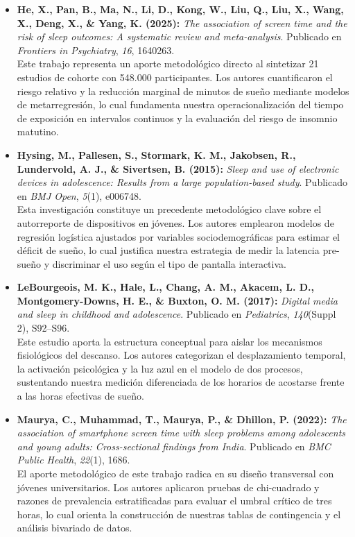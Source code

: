 \documentclass[12pt, letterpaper]{article}
\begin{document}
\begin{itemize}
    \item \textbf{He, X., Pan, B., Ma, N., Li, D., Kong, W., Liu, Q., Liu, X., Wang, X., Deng, X., \& Yang, K. (2025):} \textit{The association of screen time and the risk of sleep outcomes: A systematic review and meta-analysis}. Publicado en \textit{Frontiers in Psychiatry}, \textit{16}, 1640263.\\
    Este trabajo representa un aporte metodológico directo al sintetizar 21 estudios de cohorte con 548.000 participantes. Los autores cuantificaron el riesgo relativo y la reducción marginal de minutos de sueño mediante modelos de metarregresión, lo cual fundamenta nuestra operacionalización del tiempo de exposición en intervalos continuos y la evaluación del riesgo de insomnio matutino.

    \item \textbf{Hysing, M., Pallesen, S., Stormark, K. M., Jakobsen, R., Lundervold, A. J., \& Sivertsen, B. (2015):} \textit{Sleep and use of electronic devices in adolescence: Results from a large population-based study}. Publicado en \textit{BMJ Open}, \textit{5}(1), e006748.\\
    Esta investigación constituye un precedente metodológico clave sobre el autorreporte de dispositivos en jóvenes. Los autores emplearon modelos de regresión logística ajustados por variables sociodemográficas para estimar el déficit de sueño, lo cual justifica nuestra estrategia de medir la latencia pre-sueño y discriminar el uso según el tipo de pantalla interactiva.

    \item \textbf{LeBourgeois, M. K., Hale, L., Chang, A. M., Akacem, L. D., Montgomery-Downs, H. E., \& Buxton, O. M. (2017):} \textit{Digital media and sleep in childhood and adolescence}. Publicado en \textit{Pediatrics}, \textit{140}(Suppl 2), S92--S96.\\
    Este estudio aporta la estructura conceptual para aislar los mecanismos fisiológicos del descanso. Los autores categorizan el desplazamiento temporal, la activación psicológica y la luz azul en el modelo de dos procesos, sustentando nuestra medición diferenciada de los horarios de acostarse frente a las horas efectivas de sueño.

    \item \textbf{Maurya, C., Muhammad, T., Maurya, P., \& Dhillon, P. (2022):} \textit{The association of smartphone screen time with sleep problems among adolescents and young adults: Cross-sectional findings from India}. Publicado en \textit{BMC Public Health}, \textit{22}(1), 1686.\\
    El aporte metodológico de este trabajo radica en su diseño transversal con jóvenes universitarios. Los autores aplicaron pruebas de chi-cuadrado y razones de prevalencia estratificadas para evaluar el umbral crítico de tres horas, lo cual orienta la construcción de nuestras tablas de contingencia y el análisis bivariado de datos.


\end{itemize}
\end{document}
